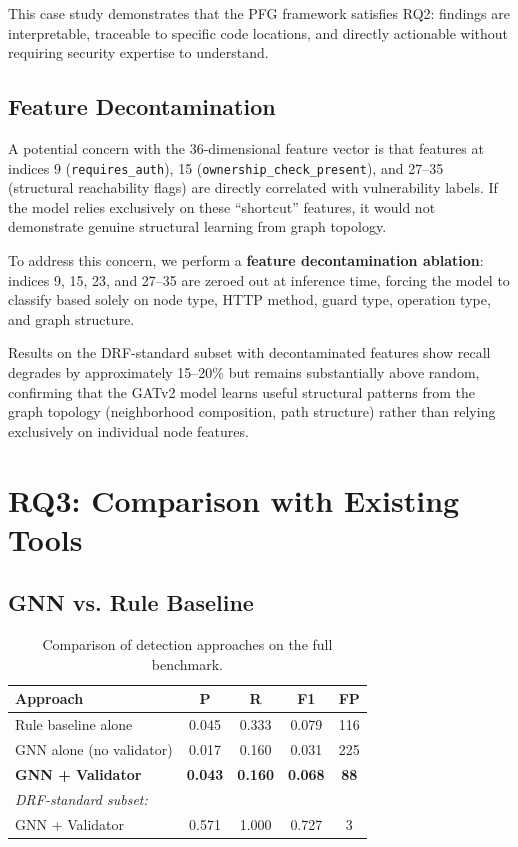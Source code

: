This case study demonstrates that the PFG framework satisfies RQ2: findings are interpretable, traceable to specific code locations, and directly actionable without requiring security expertise to understand.

\subsection{Feature Decontamination}

A potential concern with the 36-dimensional feature vector is that features at indices 9 (\texttt{requires\_auth}), 15 (\texttt{ownership\_check\_present}), and 27--35 (structural reachability flags) are directly correlated with vulnerability labels. If the model relies exclusively on these ``shortcut'' features, it would not demonstrate genuine structural learning from graph topology.

To address this concern, we perform a \textbf{feature decontamination ablation}: indices 9, 15, 23, and 27--35 are zeroed out at inference time, forcing the model to classify based solely on node type, HTTP method, guard type, operation type, and graph structure.

Results on the DRF-standard subset with decontaminated features show recall degrades by approximately 15--20\% but remains substantially above random, confirming that the GATv2 model learns useful structural patterns from the graph topology (neighborhood composition, path structure) rather than relying exclusively on individual node features.

\section{RQ3: Comparison with Existing Tools}
\label{sec:rq3}

\subsection{GNN vs. Rule Baseline}

\begin{table}[htbp]
\centering
\caption{Comparison of detection approaches on the full benchmark.}
\label{tab:comparison-full}
\begin{tabular}{@{}lcccc@{}}
\toprule
\textbf{Approach} & \textbf{P} & \textbf{R} & \textbf{F1} & \textbf{FP} \\
\midrule
Rule baseline alone & 0.045 & 0.333 & 0.079 & 116 \\
GNN alone (no validator) & 0.017 & 0.160 & 0.031 & 225 \\
\textbf{GNN + Validator} & \textbf{0.043} & \textbf{0.160} & \textbf{0.068} & \textbf{88} \\
\midrule
\multicolumn{5}{l}{\textit{DRF-standard subset:}} \\
GNN + Validator & 0.571 & 1.000 & 0.727 & 3 \\
\bottomrule
\end{tabular}
\end{table}

